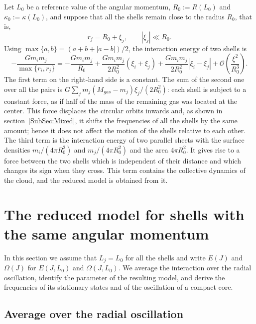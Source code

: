 \documentclass[prd,aps,nofootinbib,superscriptaddress,amsmath,amssymb]{revtex4}
\begin{document}
Let $L_0$ be a reference value of the angular momentum, $R_0 := R(L_0)$ and $\kappa_0 := \kappa(L_0)$, and suppose that all the shells remain close to the radius $R_0$, that is,
\begin{equation}
r_j = R_0 + \xi_j,\qquad |\xi_j|\ll R_0.
\label{Eq:xiDef}
\end{equation}
Using $\max\{ a,b \} = (a + b + |a - b|)/2$, the interaction energy of two shells is
\begin{equation}
-\frac{G m_i m_j}{\max\{ r_i,r_j \}} = -\frac{G m_i m_j}{R_0}
 + \frac{G m_i m_j}{2R_0^2}\left( \xi_i + \xi_j \right)
 + \frac{G m_i m_j}{2R_0^2}\left| \xi_i - \xi_j \right|
 + \mathcal{O}\left( \frac{\xi^2}{R_0^3} \right).
\label{Eq:PairExpansion}
\end{equation}
The first term on the right-hand side is a constant. The sum of the second one over all the pairs is $G\sum_j m_j(M_{gas} - m_j)\xi_j/(2R_0^2)$: each shell is subject to a constant force, as if half of the mass of the remaining gas was located at the center. This force displaces the circular orbits inwards and, as shown in section~\ref{SubSec:Mixed}, it shifts the frequencies of all the shells by the same amount; hence it does not affect the motion of the shells relative to each other. The third term is the interaction energy of two parallel sheets with the surface densities $m_i/(4\pi R_0^2)$ and $m_j/(4\pi R_0^2)$ and the area $4\pi R_0^2$. It gives rise to a force between the two shells which is independent of their distance and which changes its sign when they cross. This term contains the collective dynamics of the cloud, and the reduced model is obtained from it.


\section{The reduced model for shells with the same angular momentum}
\label{Sec:FixedL}

In this section we assume that $L_j = L_0$ for all the shells and write $E(J)$ and $\Omega(J)$ for $E(J,L_0)$ and $\Omega(J,L_0)$. We average the interaction over the radial oscillation, identify the parameter of the resulting model, and derive the frequencies of its stationary states and of the oscillation of a compact core.


\subsection{Average over the radial oscillation}
\label{SubSec:Average}
\end{document}
